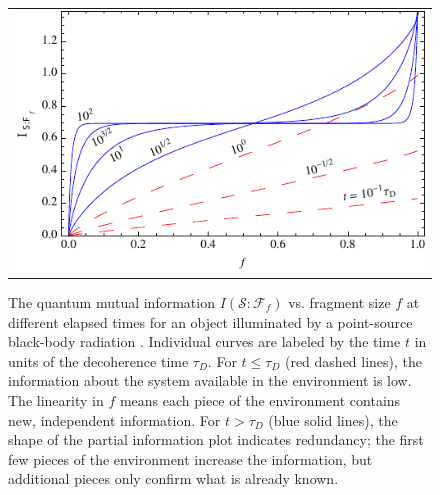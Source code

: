 \documentclass[aps,amsmath,amssymb,amsfonts,12pt]{revtex4-1}
\newcommand{\Env}{\ensuremath{\mathcal{E}}}
\newcommand{\cS}        {{\mathcal S}}
\newcommand{\cE}        {{\mathcal E}}
\newcommand{\+}         {\dagger}
\newcommand\cF{{\mathcal F}}
\newcommand\hocom[1]{}%
\begin{document}
{{{\begin{figure}[tb]
\begin{tabular}{l}
\includegraphics[width=6.5in]{QMI_plot_a_point_source.pdf}\\
\end{tabular}
\caption{The quantum mutual information $I(\cS : \cF_f )$ vs. fragment size $f$ at different elapsed times for an object illuminated by a point-source black-body radiation \cite{RiedelZ12}.
Individual curves are labeled by the time $t$ in units of the decoherence time $\tau_D$.
For $t \le\tau_D$ (red dashed lines), the information about the system available in the environment is low.  The linearity in $f$ means each piece of the environment contains new, independent information.  For $t>\tau_D$ (blue solid lines), the shape of the partial information plot indicates redundancy; the first few pieces of the environment increase the information, but additional pieces only confirm what is already known. 
\hocom{ The remaining information (i.e. above the plateau) is highly ``encrypted'' in the global state, in the sense that it can only read by capturing almost all of $\Env$ and measuring $\cS\cE$ in the right way. \\
(b) For isotropic illumination, the same time-slicing is used as in (a) but there is greatly decreased mutual information because the directional photon states are ``full'' and cannot store more information about the state of the object.}}
\label{illumination}
\end{figure}

}}}
\end{document}
